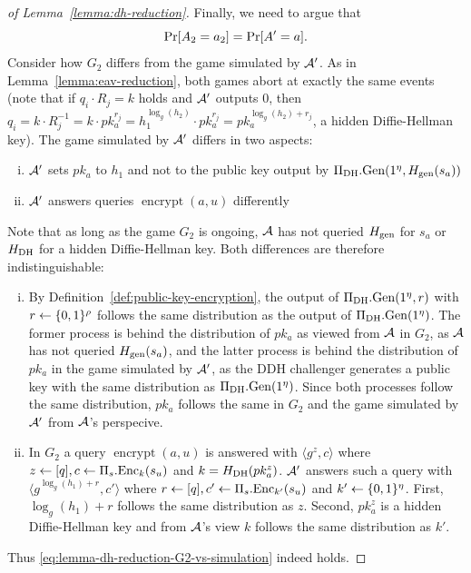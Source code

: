 \begin{proof}[of Lemma~\ref{lemma:dh-reduction}]
	Finally, we need to argue that
	\begin{equation} \label{eq:lemma-dh-reduction-G2-vs-simulation}
		\pr{A_2 = a_2} = \pr{A' = a}.
	\end{equation}
	Consider how $G_2$ differs from the game simulated by $\mathcal{A}'$. As in Lemma~\ref{lemma:eav-reduction}, both games abort at exactly the same events (note that if $q_i \cdot R_j = k$ holds and $\mathcal{A}'$ outputs $0$, then $q_i = k \cdot R_j^{-1} = k \cdot pk_a^{r_j} = h_1^{\log_g(h_2)} \cdot pk_a^{r_j} = pk_a^{\log_g(h_2) + r_j}$, a hidden Diffie-Hellman key). The game simulated by $\mathcal{A}'$ differs in two aspects:
	\begin{enumerate}[(i)]
		\item $\mathcal{A}'$ sets $pk_a$ to $h_1$ and not to the public key output by $\Pi_{\mathrm{DH}}.\mathrm{Gen}(1^\eta, H_\mathrm{gen}(s_a))$
		\item $\mathcal{A}'$ answers queries $\operatorname{encrypt}(a, u)$ differently
	\end{enumerate}
	Note that as long as the game $G_2$ is ongoing, $\mathcal{A}$ has not queried $H_\mathrm{gen}$ for $s_a$ or $H_\mathrm{DH}$ for a hidden Diffie-Hellman key. Both differences are therefore indistinguishable:
	\begin{enumerate}[(i)]
		\item By Definition~\ref{def:public-key-encryption}, the output of $\Pi_{\mathrm{DH}}.\mathrm{Gen}(1^\eta, r)$ with $r \leftarrow \{0, 1\}^\rho$ follows the same distribution as the output of $\Pi_{\mathrm{DH}}.\mathrm{Gen}(1^\eta)$. The former process is behind the distribution of $pk_a$ as viewed from $\mathcal{A}$ in $G_2$, as $\mathcal{A}$ has not queried $H_\mathrm{gen}(s_a)$, and the latter process is behind the distribution of $pk_a$ in the game simulated by $\mathcal{A}'$, as the DDH challenger generates a public key with the same distribution as $\Pi_{\mathrm{DH}}.\mathrm{Gen}(1^\eta)$. Since both processes follow the same distribution, $pk_a$ follows the same in $G_2$ and the game simulated by $\mathcal{A}'$ from $\mathcal{A}$'s perspecive.
		\item In $G_2$ a query $\operatorname{encrypt}(a, u)$ is answered with $\langle g^z, c \rangle$ where $z \leftarrow [q], c \leftarrow \Pi_s.\mathrm{Enc}_k(s_u)$ and $k = H_\mathrm{DH}(pk_a^z)$. $\mathcal{A}'$ answers such a query with $\langle g^{\log_g(h_1) + r}, c' \rangle$ where $r \leftarrow [q], c' \leftarrow \Pi_s.\mathrm{Enc}_{k'}(s_u)$ and $k' \leftarrow \{0, 1\}^\eta$. First, $\log_g(h_1) + r$ follows the same distribution as $z$. Second, $pk_a^z$ is a hidden Diffie-Hellman key and from $\mathcal{A}$'s view $k$ follows the same distribution as $k'$.
	\end{enumerate}
	Thus \eqref{eq:lemma-dh-reduction-G2-vs-simulation} indeed holds.


\end{proof}
